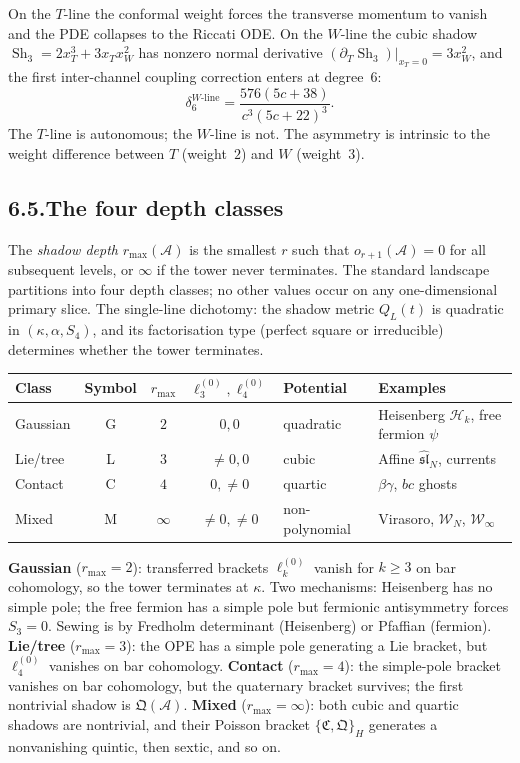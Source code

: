 \documentclass[11pt]{report}
\theoremstyle{definition}
\theoremstyle{remark}
\providecommand{\cA}{\mathcal{A}}
\providecommand{\cH}{\mathcal{H}}
\numberwithin{equation}{section}
\begin{document}
On the $T$-line the conformal weight forces the transverse momentum to
vanish and the PDE collapses to the Riccati ODE. On the $W$-line the
cubic shadow $\operatorname{Sh}_3=2x_T^3+3x_Tx_W^2$ has nonzero normal
derivative $(\partial_T\operatorname{Sh}_3)|_{x_T=0}=3x_W^2$, and the
first inter-channel coupling correction enters at degree~$6$:
\[
\delta_6^{W\text{-line}}=\frac{576(5c+38)}{c^3(5c+22)^3}.
\]
The $T$-line is autonomous; the $W$-line is not. The asymmetry is
intrinsic to the weight difference between $T$ (weight~$2$) and $W$
(weight~$3$).

\subsection*{6.5.\enspace The four depth classes}

The \emph{shadow depth} $r_{\max}(\cA)$ is the smallest $r$ such that
$o_{r+1}(\cA)=0$ for all subsequent levels, or $\infty$ if the tower
never terminates. The standard landscape partitions into four depth
classes; no other values occur on any one-dimensional primary slice.
The single-line dichotomy: the shadow metric $Q_L(t)$ is quadratic in
$(\kappa,\alpha,S_4)$, and its factorisation type (perfect square or
irreducible) determines whether the tower terminates.

\begin{center}
\renewcommand{\arraystretch}{1.3}
\begin{tabular}{lcccll}
\textbf{Class} & \textbf{Symbol} & $r_{\max}$ & $\ell_3^{(0)},\ell_4^{(0)}$ & \textbf{Potential} & \textbf{Examples}\\
\hline
Gaussian & G & $2$ & $0,0$ & quadratic & Heisenberg $\cH_k$, free fermion $\psi$\\
Lie/tree & L & $3$ & $\neq 0,0$ & cubic & Affine $\widehat{\mathfrak{sl}}_N$, currents\\
Contact & C & $4$ & $0,\neq 0$ & quartic & $\beta\gamma$, $bc$ ghosts\\
Mixed & M & $\infty$ & $\neq 0,\neq 0$ & non-polynomial & Virasoro, $\mathcal W_N$, $\mathcal W_\infty$
\end{tabular}
\end{center}

\noindent
\textbf{Gaussian} ($r_{\max}=2$): transferred brackets $\ell_k^{(0)}$
vanish for $k\ge 3$ on bar cohomology, so the tower terminates at
$\kappa$. Two mechanisms: Heisenberg has no simple pole; the free
fermion has a simple pole but fermionic antisymmetry forces $S_3=0$.
Sewing is by Fredholm determinant (Heisenberg) or Pfaffian (fermion).
\textbf{Lie/tree} ($r_{\max}=3$): the OPE has a simple pole generating
a Lie bracket, but $\ell_4^{(0)}$ vanishes on bar cohomology.
\textbf{Contact} ($r_{\max}=4$): the simple-pole bracket vanishes on
bar cohomology, but the quaternary bracket survives; the first
nontrivial shadow is $\mathfrak Q(\cA)$. \textbf{Mixed}
($r_{\max}=\infty$): both cubic and quartic shadows are nontrivial,
and their Poisson bracket $\{\mathfrak C,\mathfrak Q\}_H$ generates a
nonvanishing quintic, then sextic, and so on.
\end{document}
